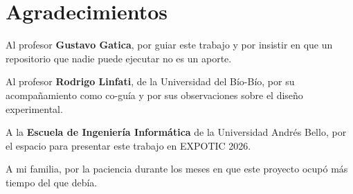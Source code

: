 \chapter*{Agradecimientos}

Al profesor \textbf{Gustavo Gatica}, por guiar este trabajo y por insistir en
que un repositorio que nadie puede ejecutar no es un aporte.

Al profesor \textbf{Rodrigo Linfati}, de la Universidad del Bío-Bío, por su
acompañamiento como co-guía y por sus observaciones sobre el diseño
experimental.

A la \textbf{Escuela de Ingeniería Informática} de la Universidad Andrés Bello,
por el espacio para presentar este trabajo en EXPOTIC 2026.

A mi familia, por la paciencia durante los meses en que este proyecto ocupó
más tiempo del que debía.
